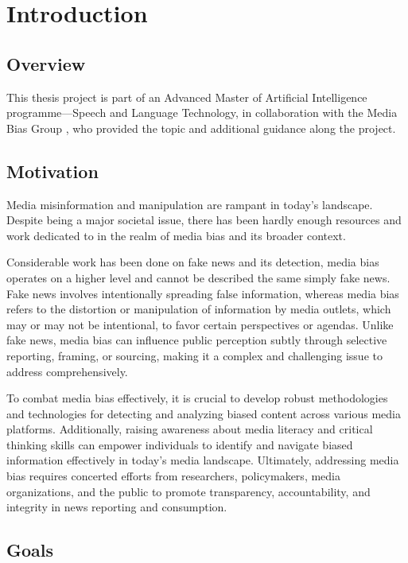 \chapter{Introduction}
\label{cha:1}

\section{Overview}

This thesis project is part of an Advanced Master of Artificial Intelligence programme—Speech and Language Technology, in collaboration with the Media Bias Group \cite{media-bias-group}, who provided the topic and additional guidance along the project.

\section{Motivation}

Media misinformation and manipulation are rampant in today's landscape. Despite being a major societal issue, there has been hardly enough resources and work dedicated to in the realm of media bias and its broader context.

Considerable work has been done on fake news and its detection, media bias operates on a higher level and cannot be described the same simply fake news. Fake news involves intentionally spreading false information, whereas media bias refers to the distortion or manipulation of information by media outlets, which may or may not be intentional, to favor certain perspectives or agendas. Unlike fake news, media bias can influence public perception subtly through selective reporting, framing, or sourcing, making it a complex and challenging issue to address comprehensively.

To combat media bias effectively, it is crucial to develop robust methodologies and technologies for detecting and analyzing biased content across various media platforms. Additionally, raising awareness about media literacy and critical thinking skills can empower individuals to identify and navigate biased information effectively in today's media landscape. Ultimately, addressing media bias requires concerted efforts from researchers, policymakers, media organizations, and the public to promote transparency, accountability, and integrity in news reporting and consumption.

\section{Goals}

